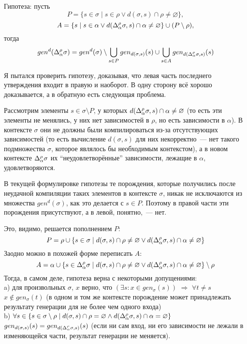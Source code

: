 





Гипотеза: пусть
$$P = \{s \in \sigma \mid s \in \rho \vee d(\sigma, s) \cap \rho \neq \varnothing \},$$
$$A = \{s \mid s \in \alpha \vee d(\Delta_\alpha^\rho\sigma, s) \cap \alpha \neq \varnothing \} \cup (P \setminus \rho),$$
тогда
$$gen^d(\Delta_\alpha^\rho\sigma) = gen^d(\sigma) \setminus \bigcup\limits_{s \in P} gen_{d(\sigma, s)}(s) \cup \bigcup\limits_{s \in A} gen_{d(\Delta_\alpha^\rho\sigma, s)}(s)$$

\hrulefill

Я пытался проверить гипотезу, доказывая, что левая часть последнего утверждения входит в правую и наоборот. В одну сторону всё хорошо доказывается, а в обратную есть следующая проблема.

Рассмотрим элементы $s \in \sigma \setminus P$, у которых $d(\Delta_\alpha^\rho\sigma, s) \cap \alpha \neq \varnothing$ (то есть эти элементы не менялись, у них нет зависимостей в $\rho$, но есть зависимости в $\alpha$). В контексте $\sigma$ они не должны были компилироваться из-за отсутствующих зависимостей (то есть вычисление $d(\sigma, s)$ для них некорректно~--- нет такого подмножества $\sigma$, которое являлось бы необходимым контекстом), а в новом контексте $\Delta_\alpha^\rho\sigma$ их ``неудовлетворённые'' зависимости, лежащие в $\alpha$, удовлетворяются.

В текущей формулировке гипотезы те порождения, которые получились после неудачной компиляции таких элементов в контексте $\sigma$, никак не исключаются из множества $gen^d(\sigma)$, как это делается с $s \in P$. Поэтому в правой части эти порождения присутствуют, а в левой, понятно,~--- нет.

Это, видимо, решается пополнением $P$:
$$P = \rho \cup \{ s \in \sigma \mid d(\sigma, s) \cap \rho \neq \varnothing \vee d(\Delta_\alpha^\rho\sigma, s) \cap \alpha \neq \varnothing \}$$
Заодно можно в похожей форме переписать $A$:
$$A = \alpha \cup \{ s \in \Delta_\alpha^\rho\sigma \mid d(\sigma, s) \cap \rho \neq \varnothing \vee d(\Delta_\alpha^\rho\sigma, s) \cap \alpha \neq \varnothing \} \setminus \rho$$
Тогда, в самом деле, гипотеза верна с некоторыми допущениями:\\
\indent a) для произвольных $\sigma$, $x$ верно, что $(\exists s: x \in gen_\sigma(s))$ $\Rightarrow$ $\forall t \neq s$ $x \notin gen_\sigma(t)$ (в одном и том же контексте порождение может принадлежать результату генерации для не более чем одного входа)\\
\indent b) $\forall s \in \{s \in \sigma \setminus \rho \mid d(\sigma, s) \cap \rho = \varnothing \wedge d(\Delta_\alpha^\rho\sigma, s) \cap \alpha = \varnothing \}$ $gen_{d(\sigma, s)} (s) = gen_{d(\Delta_\alpha^\rho\sigma, s)} (s)$ (если ни сам вход, ни его зависимости не лежали в изменяющейся части, результат генерации не меняется).\\

